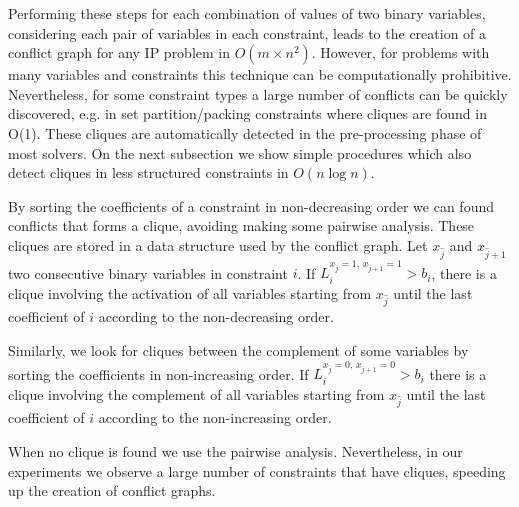 \documentclass{endm}
\begin{document}
Performing these steps for each combination of values of two binary variables, considering each pair of variables in each constraint, leads to the creation of a conflict graph for any IP problem in $O(m \times n^2)$. However, for problems with many variables and constraints this technique can be computationally prohibitive. Nevertheless, for some constraint types a large number of conflicts can be quickly discovered, e.g. in set partition/packing constraints where cliques are found in O(1). These cliques are automatically detected in the pre-processing phase of most solvers. On the next subsection we show simple procedures which also detect cliques in less structured constraints in $O( n \log n )$.

By sorting the coefficients of a constraint in non-decreasing order we can found conflicts that forms a clique, avoiding making some pairwise analysis. These cliques are stored in a data structure used by the conflict graph. Let $x_{\hat{j}}$ and $x_{\hat{j}+1}$ two consecutive binary variables in constraint $i$. If $L_{i}^{x_{\hat{j}}=1,\, x_{\hat{j}+1}=1}>b_{i}$, there is a clique involving the activation of all variables starting from $x_{\hat{j}}$ until the last coefficient of $i$ according to the non-decreasing order. 

Similarly, we look for cliques between the complement of some variables by sorting the coefficients in non-increasing order. If $L_{i}^{x_{\hat{j}} = 0,\, x_{\hat{j}+1} = 0} > b_i$ there is a clique involving the complement of all variables starting from $x_{\hat{j}}$ until the last coefficient of $i$ according to the non-increasing order.

When no clique is found we use the pairwise analysis. Nevertheless, in our experiments we observe a large number of constraints that have cliques, speeding up the creation of conflict graphs.
\end{document}
